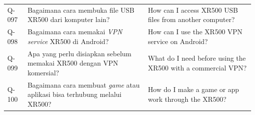 \begin{longtable}{@{}>{\RaggedRight\arraybackslash}p{1.6cm}>{\RaggedRight\arraybackslash}p{5.8cm}>{\RaggedRight\arraybackslash}p{\dimexpr\textwidth-1.6cm-5.8cm-4\tabcolsep\relax}@{}}
Q-097 & Bagaimana cara membuka file USB XR500 dari komputer lain? & How can I access XR500 USB files from another computer? \\
Q-098 & Bagaimana cara memakai \emph{VPN service} XR500 di Android? & How can I use the XR500 VPN service on Android? \\
Q-099 & Apa yang perlu disiapkan sebelum memakai XR500 dengan VPN komersial? & What do I need before using the XR500 with a commercial VPN? \\
Q-100 & Bagaimana cara membuat \emph{game} atau aplikasi bisa terhubung melalui XR500? & How do I make a game or app work through the XR500? \\
\end{longtable}
\endgroup
